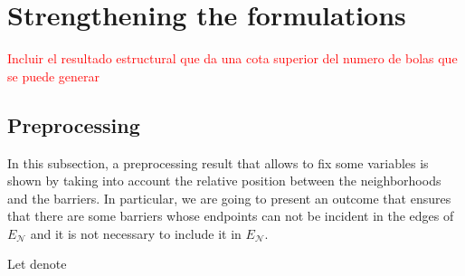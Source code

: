 \documentclass[a4paper]{elsarticle}
\newcommand{\EN}{{E^{}_{\mathcal N}}}
\begin{document}
	
	\section{Strengthening the formulations}\label{section:strengthening}
	\textcolor{red}{Incluir el resultado estructural que da una cota superior del numero de bolas que se puede generar}
	\subsection{Preprocessing}\label{subsection:preprocessing}
	In this subsection, a preprocessing result that allows to fix some variables is shown by taking into account the relative position between the neighborhoods and the barriers.
	In particular, we are going to present an outcome that ensures that there are some barriers whose endpoints can not be incident in the edges of $\EN$ and it is not necessary to include it in $\EN$. 
	
	Let denote
	
\end{document}
